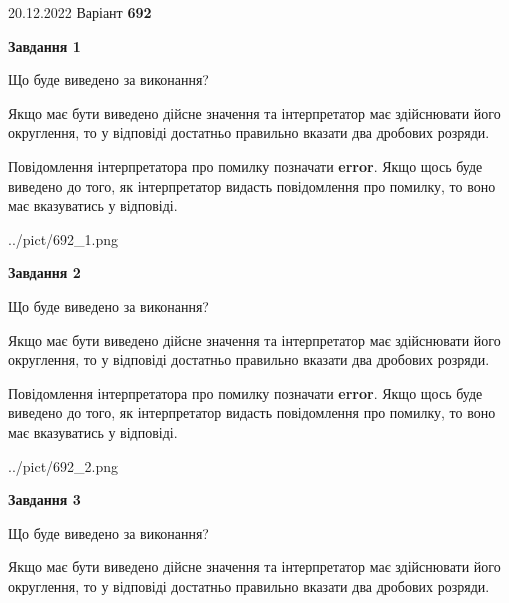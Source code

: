 \documentclass[12pt, ukrainian]{article}
\begin{document}
{20.12.2022 Варіант \No \textbf { 692 }\par}
{
\begin {Large}

{\begin {center}\textbf{Завдання 1}\end {center}}\par
Що буде виведено за виконання? \par

Якщо має бути виведено дійсне значення та інтерпретатор має здійснювати його округлення, 
то у відповіді достатньо правильно вказати два дробових розряди.

Повідомлення інтерпретатора про помилку позначати \textbf{error}.
Якщо щось буде виведено до того, як інтерпретатор видасть повідомлення про помилку, 
то воно має вказуватись у відповіді. \par

\begin{center}
	{../pict/692_1.png}
\end{center}
\newpage

{\begin {center}\textbf{Завдання 2}\end {center}}\par
Що буде виведено за виконання? \par

Якщо має бути виведено дійсне значення та інтерпретатор має здійснювати його округлення, 
то у відповіді достатньо правильно вказати два дробових розряди.

Повідомлення інтерпретатора про помилку позначати \textbf{error}.
Якщо щось буде виведено до того, як інтерпретатор видасть повідомлення про помилку, 
то воно має вказуватись у відповіді. \par

\begin{center}
	{../pict/692_2.png}
\end{center}
\newpage

{\begin {center}\textbf{Завдання 3}\end {center}}\par
Що буде виведено за виконання? \par

Якщо має бути виведено дійсне значення та інтерпретатор має здійснювати його округлення, 
то у відповіді достатньо правильно вказати два дробових розряди.


\end{Large}}
\end{document}
